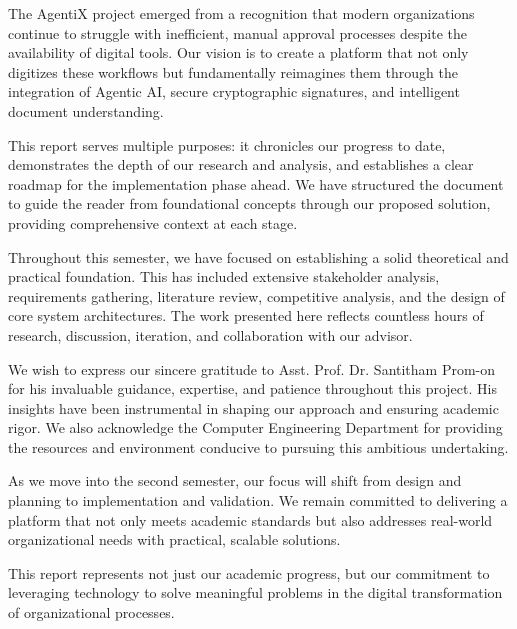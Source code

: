 \documentclass[12pt,oneside,openright,a4paper]{cpe-english-project}
\begin{document}
The AgentiX project emerged from a recognition that modern organizations continue to struggle with inefficient, manual approval processes despite the availability of digital tools. Our vision is to create a platform that not only digitizes these workflows but fundamentally reimagines them through the integration of Agentic AI, secure cryptographic signatures, and intelligent document understanding.

\vspace{1em}

This report serves multiple purposes: it chronicles our progress to date, demonstrates the depth of our research and analysis, and establishes a clear roadmap for the implementation phase ahead. We have structured the document to guide the reader from foundational concepts through our proposed solution, providing comprehensive context at each stage.

\vspace{1em}

Throughout this semester, we have focused on establishing a solid theoretical and practical foundation. This has included extensive stakeholder analysis, requirements gathering, literature review, competitive analysis, and the design of core system architectures. The work presented here reflects countless hours of research, discussion, iteration, and collaboration with our advisor.

\vspace{1em}

We wish to express our sincere gratitude to Asst. Prof. Dr. Santitham Prom-on for his invaluable guidance, expertise, and patience throughout this project. His insights have been instrumental in shaping our approach and ensuring academic rigor. We also acknowledge the Computer Engineering Department for providing the resources and environment conducive to pursuing this ambitious undertaking.

\vspace{1em}

As we move into the second semester, our focus will shift from design and planning to implementation and validation. We remain committed to delivering a platform that not only meets academic standards but also addresses real-world organizational needs with practical, scalable solutions.

\vspace{1em}

This report represents not just our academic progress, but our commitment to leveraging technology to solve meaningful problems in the digital transformation of organizational processes.
\end{document}
